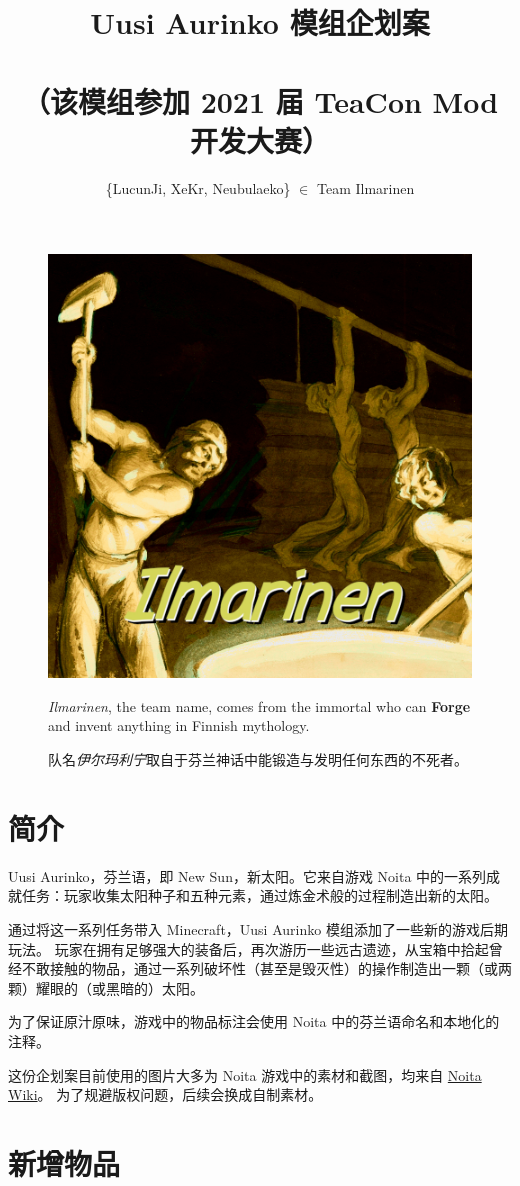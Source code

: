 \documentclass[11pt]{article}
\title{Uusi Aurinko 模组企划案\\
\ \\
\small{（该模组参加 2021 届 TeaCon Mod 开发大赛）}}
\author{\{LucunJi, XeKr, Neubulaeko\} $\in$ Team Ilmarinen}
\begin{document}
    \maketitle
    \begin{figure}[ht!]
        \centering
        \includegraphics[width=.5\textwidth]{../Ilmarinen}

        \small{\textit{Ilmarinen}, the team name, comes from the immortal who can \textbf{Forge} and invent anything in Finnish mythology.}

        \small{队名\textit{伊尔玛利宁}取自于芬兰神话中能锻造与发明任何东西的不死者。}
        \label{fig:group}
    \end{figure}

    \clearpage
    \tableofcontents

    \clearpage
    \section{简介}\label{sec:intro}
    Uusi Aurinko，芬兰语，即 New Sun，新太阳。它来自游戏 Noita 中的一系列成就任务：玩家收集太阳种子和五种元素，通过炼金术般的过程制造出新的太阳。

    通过将这一系列任务带入 Minecraft，Uusi Aurinko 模组添加了一些新的游戏后期玩法。
    玩家在拥有足够强大的装备后，再次游历一些远古遗迹，从宝箱中拾起曾经不敢接触的物品，通过一系列破坏性（甚至是毁灭性）的操作制造出一颗（或两颗）耀眼的（或黑暗的）太阳。

    为了保证原汁原味，游戏中的物品标注会使用 Noita 中的芬兰语命名和本地化的注释。

    \vspace{1em}
    这份企划案目前使用的图片大多为 Noita 游戏中的素材和截图，均来自 \href{https://noita.fandom.com/wiki/Noita_Wiki}{Noita Wiki}。
    为了规避版权问题，后续会换成自制素材。

    \clearpage
    \section{新增物品}\label{sec:new-items}
\end{document}
